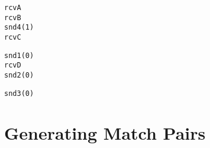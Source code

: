 
\newsavebox{\boxtaskzero}
\begin{lrbox}{\boxtaskzero}
\begin{minipage}[t]{0.2\linewidth}
\begin{alltt}
rcvA
rcvB
snd4(1)
rcvC
\end{alltt}
\end{minipage}
\end{lrbox}

\newsavebox{\boxtaskone}
\begin{lrbox}{\boxtaskone}
\begin{minipage}[t]{0.2\linewidth}
\begin{alltt}
snd1(0)
rcvD
snd2(0)
\end{alltt}
\end{minipage}
\end{lrbox}

\newsavebox{\boxtasktwo}
\begin{lrbox}{\boxtasktwo}
\begin{minipage}[t]{0.2\linewidth}
\begin{alltt}
snd3(0)
\end{alltt}
\end{minipage}
\end{lrbox}

\section{Generating Match Pairs}


